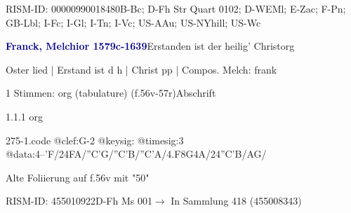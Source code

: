 \documentclass[twocolumn, 12pt]{book}
\begin{document}
\par RISM-ID: 00000990018480\newline B-Bc; D-Fh  Str Quart 0102; D-WEMl; E-Zac; F-Pn; GB-Lbl; I-Fc; I-Gl; I-Tn; I-Vc; US-AAu; US-NYhill; US-Wc
\par \vspace{16pt} \textcolor{darkblue}{\textbf{Franck, Melchior  1579c-1639}}\hfillplus{\textbf{[275]}}\newline Erstanden ist der heilig' Christ\newline org
\par \begin{itshape}[f.56v, at left:] Oster lied | Erstand ist d h | Christ pp | Compos. Melch: frank\end{itshape} 
\par \textcolor{darkblue}{}  1 Stimmen: org (tabulature)  (f.56v-57r)\newline Abschrift
\par 1.1.1  org  
\begin{filecontents*}{275-1.code}
@clef:G-2
@keysig:
@timesig:3
@data:4--'F/24FA/''C'G/''C'B/''C'A/4.F8G4A/24''C'B/AG/
\end{filecontents*}
\newline %
\par Alte Foliierung auf f.56v mit "50"
\par RISM-ID: 455010922\newline D-Fh  Ms 001\newline $\rightarrow$ In Sammlung 418 (455008343)
      
\end{document}
